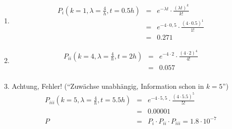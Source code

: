 \documentclass{homework}
\begin{document}
\begin{enumerate}


\begin{enumerate}
\item \begin{eqnarray*}
P_i(k=1, \lambda = \frac{4}{h}, t=0.5h)
& = & e^{-\lambda t} \cdot \frac{(\lambda t)^k}{k!}\\
& = & e^{-4 \cdot 0,5} \cdot \frac{(4 \cdot 0.5)^1}{1!}\\
& = & 0.271
\end{eqnarray*}
\item \begin{eqnarray*}
P_{ii}(k=4, \lambda = \frac{4}{h}, t=2h)
& = & e^{-4 \cdot 2} \cdot \frac{(4 \cdot 2)^4}{4!}\\
& = & 0.057\\
\end{eqnarray*}
\item Achtung, Fehler! ("`Zuwächse unabhängig, Information schon in $k=5$"') \begin{eqnarray*}
P_{iii}(k=5, \lambda = \frac{4}{h}, t=5.5h)
& = & e^{-4 \cdot 5,5} \cdot \frac{(4 \cdot 5.5)^5}{5!}\\
& = & 0.00001\\
P & = & P_i \cdot P_{ii} \cdot P_{iii} = 1.8 \cdot 10^{-7}\\
\end{eqnarray*}
\end{enumerate}


\end{enumerate}
\end{document}

